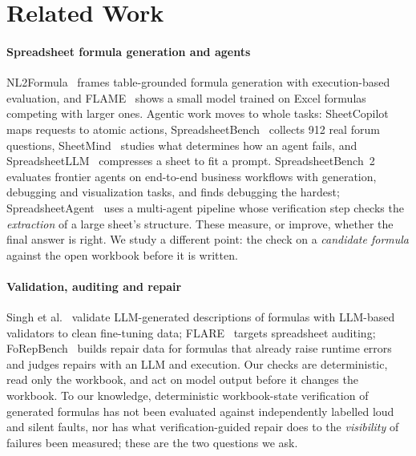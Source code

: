 \section{Related Work}
\label{sec:related}

\paragraph{Spreadsheet formula generation and agents}
NL2Formula~\cite{zhao2024nl2formula} frames table-grounded formula generation with execution-based evaluation, and FLAME~\cite{joshi2024flame} shows a small model trained on Excel formulas competing with larger ones. Agentic work moves to whole tasks: SheetCopilot~\cite{li2023sheetcopilot} maps requests to atomic actions, SpreadsheetBench~\cite{ma2024spreadsheetbench} collects 912 real forum questions, SheetMind~\cite{chen2025sheetmind} studies what determines how an agent fails, and SpreadsheetLLM~\cite{dong2024spreadsheetllm} compresses a sheet to fit a prompt. SpreadsheetBench~2~\cite{zhu2026spreadsheetbench2} evaluates frontier agents on end-to-end business workflows with generation, debugging and visualization tasks, and finds debugging the hardest; SpreadsheetAgent~\cite{ren2026spreadsheetagent} uses a multi-agent pipeline whose verification step checks the \emph{extraction} of a large sheet's structure. These measure, or improve, whether the final answer is right. We study a different point: the check on a \emph{candidate formula} against the open workbook before it is written.

\paragraph{Validation, auditing and repair}
Singh et al.~\cite{singh2025validating} validate LLM-generated descriptions of formulas with LLM-based validators to clean fine-tuning data; FLARE~\cite{thorne2025flare} targets spreadsheet auditing; FoRepBench~\cite{singha2025forepbench} builds repair data for formulas that already raise runtime errors and judges repairs with an LLM and execution. Our checks are deterministic, read only the workbook, and act on model output before it changes the workbook. To our knowledge, deterministic workbook-state verification of generated formulas has not been evaluated against independently labelled loud and silent faults, nor has what verification-guided repair does to the \emph{visibility} of failures been measured; these are the two questions we ask.


